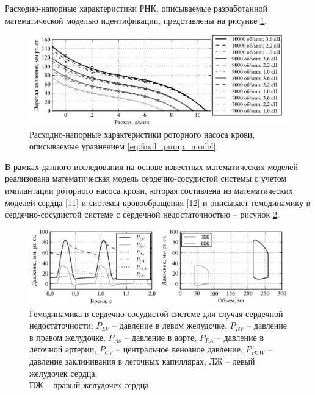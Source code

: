 Расходно-напорные характеристики РНК, описываемые разработанной математической моделью идентификации, представлены на рисунке \ref{img:final_pump_model}.


\begin{figure}[ht] 
  \center
  \includegraphics [scale=1.0] {../images/static_model_final_abs}
  \caption{Расходно-напорные характеристики роторного насоса крови, описываемые уравнением \eqref{eq:final_pump_model}} 
  \label{img:final_pump_model}  
\end{figure}

В рамках данного исследования на основе известных математических моделей реализована математическая модель сердечно-сосудистой системы с учетом имплантации роторного насоса крови, которая составлена из математических моделей сердца [11] и системы кровообращения [12] и описывает гемодинамику в сердечно-сосудистой системе с сердечной недостаточностью -- рисунок \ref{img:cvs_hemodynamics}.

\begin{figure}[ht] 
  \center
  \includegraphics [scale=1.0] {../images/cvs_hemodynamics_abs} 
  \caption{Гемодинамика в сердечно-сосудистой системе для случая сердечной недостаточности; $P_{LV}$ -- давление в левом желудочке, $P_{RV}$ -- давление в правом желудочке, $P_{Ao}$ -- давление в аорте, $P_{PA}$ -- давление в легочной артерии, $P_{CV}$ -- центральное венозное давление, $P_{PCW}$ -- давление заклинивания в легочных капиллярах, ЛЖ -- левый желудочек сердца, \\ПЖ -- правый желудочек сердца}
  \label{img:cvs_hemodynamics}
\end{figure}

